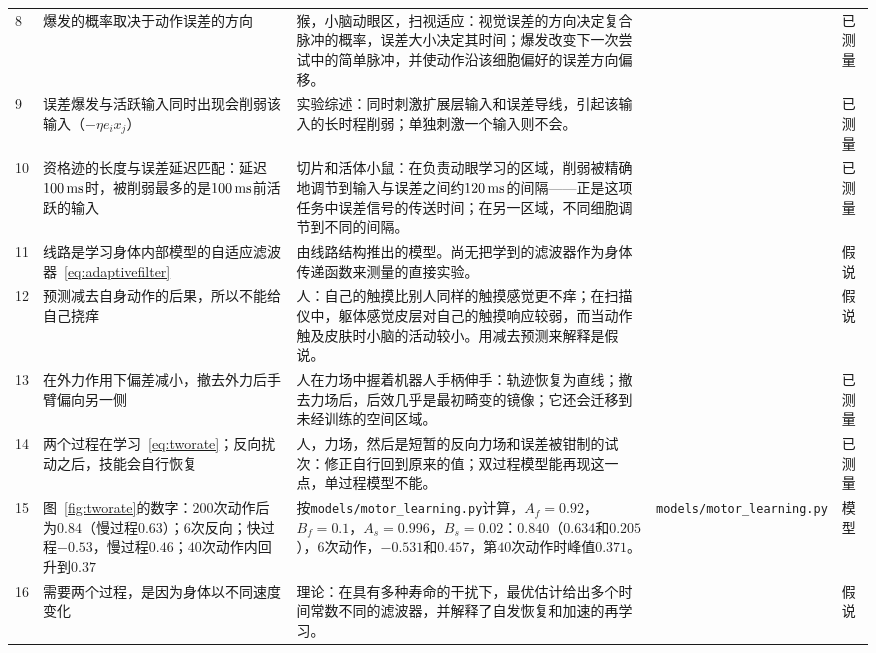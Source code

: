 {\begin{longtable}{>{\raggedright}p{0.5cm}>{\raggedright}p{4.0cm}>{\raggedright}p{5.6cm}>{\raggedright}p{2.3cm}>{\raggedright\arraybackslash}p{1.7cm}}
8 & 爆发的概率取决于动作误差的方向 & 猴，小脑动眼区，扫视适应：视觉误差的方向决定复合脉冲的概率，误差大小决定其时间；爆发改变下一次尝试中的简单脉冲，并使动作沿该细胞偏好的误差方向偏移。 & \cite{Herzfeld2018} & 已测量 \\
9 & 误差爆发与活跃输入同时出现会削弱该输入（$-\eta e_i x_j$） & 实验综述：同时刺激扩展层输入和误差导线，引起该输入的长时程削弱；单独刺激一个输入则不会。 & \cite{Ito2001} & 已测量 \\
10 & 资格迹的长度与误差延迟匹配：延迟$100\,\text{ms}$时，被削弱最多的是$100\,\text{ms}$前活跃的输入 & 切片和活体小鼠：在负责动眼学习的区域，削弱被精确地调节到输入与误差之间约$120\,\text{ms}$的间隔——正是这项任务中误差信号的传送时间；在另一区域，不同细胞调节到不同的间隔。 & \cite{Suvrathan2016} & 已测量 \\
11 & 线路是学习身体内部模型的自适应滤波器~\eqref{eq:adaptivefilter} & 由线路结构推出的模型。尚无把学到的滤波器作为身体传递函数来测量的直接实验。 & \cite{Fujita1982} & 假说 \\
12 & 预测减去自身动作的后果，所以不能给自己挠痒 & 人：自己的触摸比别人同样的触摸感觉更不痒；在扫描仪中，躯体感觉皮层对自己的触摸响应较弱，而当动作触及皮肤时小脑的活动较小。用减去预测来解释是假说。 & \cite{Blakemore1998} & 假说 \\
13 & 在外力作用下偏差减小，撤去外力后手臂偏向另一侧 & 人在力场中握着机器人手柄伸手：轨迹恢复为直线；撤去力场后，后效几乎是最初畸变的镜像；它还会迁移到未经训练的空间区域。 & \cite{ShadmehrMussaIvaldi1994} & 已测量 \\
14 & 两个过程在学习~\eqref{eq:tworate}；反向扰动之后，技能会自行恢复 & 人，力场，然后是短暂的反向力场和误差被钳制的试次：修正自行回到原来的值；双过程模型能再现这一点，单过程模型不能。 & \cite{Smith2006} & 已测量 \\
15 & 图~\ref{fig:tworate}的数字：$200$次动作后为$0.84$（慢过程$0.63$）；$6$次反向；快过程$-0.53$，慢过程$0.46$；$40$次动作内回升到$0.37$ & 按\texttt{models/\allowbreak motor\_\allowbreak learning.py}计算，$A_f=0.92$，$B_f=0.1$，$A_s=0.996$，$B_s=0.02$：$0.840$（$0.634$和$0.205$），$6$次动作，$-0.531$和$0.457$，第$40$次动作时峰值$0.371$。 & \texttt{models/\allowbreak motor\_\allowbreak learning.py} & 模型 \\
16 & 需要两个过程，是因为身体以不同速度变化 & 理论：在具有多种寿命的干扰下，最优估计给出多个时间常数不同的滤波器，并解释了自发恢复和加速的再学习。 & \cite{Kording2007} & 假说 \\
\bottomrule
\end{longtable}}
